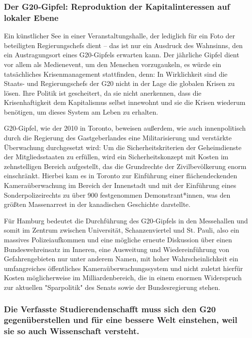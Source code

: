 \documentclass[ngerman,headheight=70pt]{scrartcl}
\begin{document}
    \subsubsection*{Der G20-Gipfel: Reproduktion der Kapitalinteressen auf lokaler
    Ebene}

    Ein künstlicher See in einer Veranstaltungshalle, der lediglich für ein Foto
    der beteiligten Regierungschefs dient -- das ist nur ein Ausdruck des
    Wahnsinns, den ein Austragungsort eines G20-Gipfels erwarten kann. Der
    jährliche Gipfel dient vor allem  als  Medienevent, um den Menschen
    vorzugaukeln, es würde ein tatsächliches Krisenmanagement stattfinden, denn:
    In Wirklichkeit sind die Staats- und Regierungschefs der G20 nicht in der
    Lage die globalen Krisen zu lösen. Ihre Politik ist gescheitert, da sie nicht
    anerkennen, dass die Krisenhaftigkeit dem Kapitalismus selbst innewohnt und
    sie die Krisen wiederum benötigen, um dieses System am Leben zu erhalten.

    G20-Gipfel, wie der 2010 in Toronto, beweisen außerdem, wie auch
    innenpolitisch durch die Regierung des Gastgeberlandes eine Militarisierung
    und verstärkte Überwachung durchgesetzt wird: Um die Sicherheitskriterien
    der Geheimdienste der Mitgliedsstaaten zu erfüllen, wird ein Sicherheitskonzept
    mit Kosten im zehnstelligen Bereich aufgestellt, das die Grundrechte der
    Zivilbevölkerung enorm einschränkt. Hierbei kam es in Toronto zur Einführung
    einer flächendeckenden Kameraüberwachung im Bereich der Innenstadt und mit
    der Einführung eines Sonderpolizeirechts zu über 900 festgenommen
    Demonstrant*innen, was den größten Massenarrest in der kanadischen Geschichte
    darstellte.

    Für Hamburg bedeutet die Durchführung des G20-Gipfels in den Messehallen und
    somit im Zentrum zwischen Universität, Schanzenviertel und St. Pauli, also
    ein massives Polizeiaufkommen und eine mögliche erneute Diskussion über einen
    Bundeswehreinsatz im Inneren, eine Ausweitung und Wiedereinführung von
    Gefahrengebieten nur unter anderem Namen, mit hoher Wahrscheinlichkeit ein
    umfangreiches öffentliches Kameraüberwachungssystem und nicht zuletzt hierfür
    Kosten möglicherweise im Milliardenbereich, die in einem enormen Widerspruch
    zur aktuellen "Sparpolitik" des Senats sowie der Bundesregierung stehen.

    \subsubsection*{Die Verfasste Studierendenschafft muss sich den G20 gegenüberstellen
    und für eine bessere Welt einstehen, weil sie so auch Wissenschaft versteht.}
\end{document}

